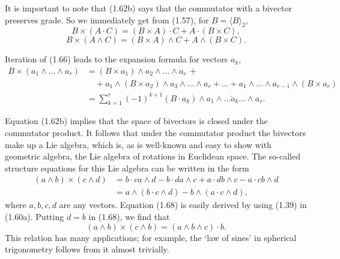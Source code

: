 \documentclass[fleqn]{scrartcl}
\numberwithin{equation}{section}
\begin{document}
\noindent It is important to note that (1.62b) says that the commutator with a bivector preserves grade. So we immediately get from (1.57), for \(B = \langle B \rangle_2\),
\begin{equation}
B \times (A \cdot C) = (B \times A) \cdot C + A \cdot (B \times C), \tag{1.65}
\end{equation}
\begin{equation}
B \times (A \wedge C) = (B \times A) \wedge C + A \wedge (B \times C). \tag{1.66}
\end{equation}

\noindent Iteration of (1.66) leads to the expansion formula for vectors \(a_k\),
\begin{equation}
\begin{aligned}
B \times (a_1 \wedge \dots \wedge a_r) &= (B \times a_1) \wedge a_2 \wedge \dots \wedge a_r \, + \\
&\quad + a_1 \wedge (B \times a_2) \wedge a_3 \wedge \dots \wedge a_r + \dots + a_1 \wedge \dots \wedge a_{r-1} \wedge (B \times a_r) \\
&= \sum_{k=1}^r (-1)^{k+1} (B \cdot a_k) \wedge a_1 \wedge \dots \breve{a}_k \dots \wedge a_r.
\end{aligned}
\tag{1.67}
\end{equation}

\noindent Equation (1.62b) implies that the space of bivectors is closed under the commutator product. It follows that under the commutator product the bivectors make up a Lie algebra, which is, as is well-known and easy to show with geometric algebra, the Lie algebra of rotations in Euclidean space. The so-called structure equations for this Lie algebra can be written in the form
\begin{equation}
\begin{aligned}
(a \wedge b) \times (c \wedge d) &= b \cdot ca \wedge d - b \cdot da \wedge c + a \cdot db \wedge c - a \cdot cb \wedge d \\
&= a \wedge (b \cdot c \wedge d) - b \wedge (a \cdot c \wedge d),
\end{aligned}
\tag{1.68}
\end{equation}
where \(a, b, c, d\) are any vectors. Equation (1.68) is easily derived by using (1.39) in (1.60a). Putting \(d = b\) in (1.68), we find that
\begin{equation}
(a \wedge b) \times (c \wedge b) = (a \wedge b \wedge c) \cdot b. \tag{1.69}
\end{equation}
This relation has many applications; for example, the `law of sines' in spherical trigonometry follows from it almost trivially.
\end{document}
